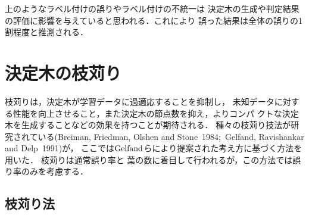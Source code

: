 上のようなラベル付けの誤りやラベル付けの不統一は
決定木の生成や判定結果の評価に影響を与えていると思われる．これにより
誤った結果は全体の誤りの1割程度と推測される．
\section{決定木の枝苅り}
枝苅りは，決定木が学習データに過適応することを抑制し，
未知データに対する性能を向上させること，また決定木の節点数を抑え，よりコンパ
クトな決定木を生成することなどの効果を持つことが期待される．
種々の枝苅り技法が研究されている(Breiman, Friedman, Olshen and Stone\
1984;\ Gelfand, Ravishankar  and Delp\ 1991)が，
ここでは$\rm Gelfand$らにより提案された考え方に基づく方法を
用いた．
枝苅りは通常誤り率と
葉の数に着目して行われるが，この方法では誤り率のみを考慮する．
\subsection{枝苅り法}


